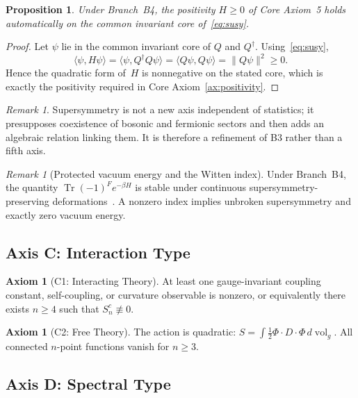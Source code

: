 \documentclass[12pt,a4paper]{article}
\theoremstyle{plain}
\newtheorem{proposition}[theorem]{Proposition}
\theoremstyle{definition}
\newtheorem{axiom}[theorem]{Axiom}
\theoremstyle{remark}
\newtheorem{remark}[theorem]{Remark}
\newcommand{\vol}{\operatorname{vol}}
\newcommand{\Tr}{\operatorname{Tr}}
\begin{document}
\begin{proposition}\label{prop:susy-positivity}
  Under Branch~B4, the positivity $H \ge 0$ of Core Axiom~5 holds
  automatically on the common invariant core of~\eqref{eq:susy}.
\end{proposition}
\begin{proof}
  Let $\psi$ lie in the common invariant core of $Q$ and $Q^\dagger$.
  Using~\eqref{eq:susy},
  \[
    \langle \psi, H\psi\rangle
    = \langle \psi, Q^\dagger Q\psi\rangle
    = \langle Q\psi, Q\psi\rangle
    = \|Q\psi\|^2 \ge 0.
  \]
  Hence the quadratic form of~$H$ is nonnegative on the stated core,
  which is exactly the positivity required in Core
  Axiom~\ref{ax:positivity}.
\end{proof}

\begin{remark}
  Supersymmetry is not a new axis independent of statistics; it
  presupposes coexistence of bosonic and fermionic sectors and then
  adds an algebraic relation linking them. It is therefore a
  refinement of B3 rather than a fifth axis.
\end{remark}

\begin{remark}[Protected vacuum energy and the Witten index]
  Under Branch~B4, the quantity
  $\Tr(-1)^F e^{-\beta H}$ is stable under continuous
  supersymmetry-preserving deformations~\cite{Witten}. A nonzero index
  implies unbroken supersymmetry and exactly zero vacuum energy.
\end{remark}


\subsection{Axis C: Interaction Type}

\begin{axiom}[C1: Interacting Theory]\label{ax:C1}
  At least one gauge-invariant coupling constant, self-coupling, or
  curvature observable is nonzero, or equivalently there exists
  $n \ge 4$ such that $S^c_n \not\equiv 0$.
\end{axiom}

\begin{axiom}[C2: Free Theory]\label{ax:C2}
  The action is quadratic:
  $S = \int \frac{1}{2}\Phi \cdot D \cdot \Phi\, d\vol_g$. All
  connected $n$-point functions vanish for $n \ge 3$.
\end{axiom}


\subsection{Axis D: Spectral Type}
\end{document}
